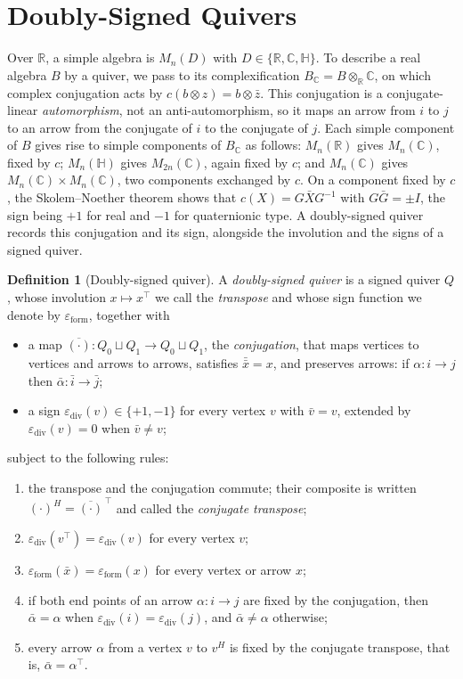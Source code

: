 \documentclass[12pt, a4paper]{report}
\theoremstyle{plain}
\theoremstyle{definition}
\newtheorem{definition}[theorem]{Definition}
\theoremstyle{remark}
\theoremstyle{plain}
\newcommand{\epsilondiv}{\varepsilon_{\mathrm{div}}}
\newcommand{\epsilonform}{\varepsilon_{\mathrm{form}}}
\newcommand{\RR}{\mathbb{R}}
\newcommand{\CC}{\mathbb{C}}
\newcommand{\HH}{\mathbb{H}}
\begin{document}
\section{Doubly-Signed Quivers}
\label{sec:dsq}
Over $\RR$, a simple algebra is $M_n(D)$ with $D\in\{\RR,\CC,\HH\}$. To describe a real algebra $B$ by a quiver, we pass to its complexification $B_\CC=B\otimes_\RR\CC$, on which complex conjugation acts by $c(b\otimes z)=b\otimes\bar z$. This conjugation is a conjugate-linear \emph{automorphism}, not an anti-automorphism, so it maps an arrow from $i$ to $j$ to an arrow from the conjugate of $i$ to the conjugate of $j$. Each simple component of $B$ gives rise to simple components of $B_\CC$ as follows: $M_n(\RR)$ gives $M_n(\CC)$, fixed by $c$; $M_n(\HH)$ gives $M_{2n}(\CC)$, again fixed by $c$; and $M_n(\CC)$ gives $M_n(\CC)\times M_n(\CC)$, two components exchanged by $c$. On a component fixed by $c$, the Skolem--Noether theorem shows that $c(X)=G\bar XG^{-1}$ with $G\bar G=\pm I$, the sign being $+1$ for real and $-1$ for quaternionic type. A doubly-signed quiver records this conjugation and its sign, alongside the involution and the signs of a signed quiver.

\begin{definition}[Doubly-signed quiver]\label{def:doubly-signed}
A \emph{doubly-signed quiver} is a signed quiver $Q$, whose involution $x\mapsto x^{\top}$ we call the \emph{transpose} and whose sign function we denote by $\epsilonform$, together with
\begin{itemize}
  \item a map $\overline{(\cdot)}:Q_0\sqcup Q_1\to Q_0\sqcup Q_1$, the \emph{conjugation}, that maps vertices to vertices and arrows to arrows, satisfies $\bar{\bar x}=x$, and preserves arrows: if $\alpha:i\to j$ then $\bar\alpha:\bar i\to\bar j$;
  \item a sign $\epsilondiv(v)\in\{+1,-1\}$ for every vertex $v$ with $\bar v=v$, extended by $\epsilondiv(v)=0$ when $\bar v\neq v$;
\end{itemize}
subject to the following rules:
\begin{enumerate}
    \item the transpose and the conjugation commute; their composite is written $(\cdot)^H=\overline{(\cdot)}^{\,\top}$ and called the \emph{conjugate transpose};
    \item $\epsilondiv(v^{\top})=\epsilondiv(v)$ for every vertex $v$;
    \item $\epsilonform(\bar x)=\epsilonform(x)$ for every vertex or arrow $x$;
    \item if both end points of an arrow $\alpha:i\to j$ are fixed by the conjugation, then $\bar\alpha=\alpha$ when $\epsilondiv(i)=\epsilondiv(j)$, and $\bar\alpha\neq\alpha$ otherwise;
    \item every arrow $\alpha$ from a vertex $v$ to $v^H$ is fixed by the conjugate transpose, that is, $\bar\alpha=\alpha^{\top}$.
\end{enumerate}
\end{definition}
\end{document}
